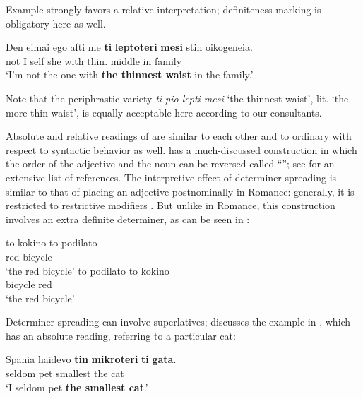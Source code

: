 \documentclass[output=paper
,modfonts
,nonflat]{langsci/langscibook}
\begin{document}
Example  strongly favors a relative interpretation; definiteness\hyp{}marking is obligatory here as well.

\ea \label{ex:coppockstrand:8}
\gll Den eimai ego afti me \textbf{ti} \textbf{leptoteri} \textbf{mesi} stin oikogeneia.\\
not I self she with  thin.\cmpr{} middle in family\\
\glt `I'm not the one with \textbf{the thinnest waist} in the family.'
\z

Note that the periphrastic variety \textit{ti pio lepti mesi} `the thinnest waist', lit. `the more thin waist', is equally acceptable here according to our consultants.

Absolute and relative readings of  are similar to each other and to ordinary  with respect to syntactic behavior as well.  has a much-discussed construction in which the order of the adjective and the noun can be reversed called ``''; see \citet[19]{Alexiadou2014} for an extensive list of references. The interpretive effect of determiner spreading is similar to that of placing an adjective postnominally in Romance: generally, it is restricted to restrictive modifiers \citep{AlexiadouWilder1998}. But unlike in Romance, this construction involves an extra definite determiner, as can be seen in :

\ea \label{ex:coppockstrand:9}
\begin{xlist}
\ex
\gll to kokino to podilato\\
  red   bicycle\\
\glt `the red bicycle'
\ex 
\gll  to podilato to kokino\\
   bicycle   red\\
\glt  `the red bicycle'
\end{xlist}
\z

Determiner spreading can involve superlatives; \citet{Alexiadou2014} discusses the example in , which has an absolute reading, referring to a particular cat:

\ea \label{ex:coppockstrand:10} 
\gll Spania haidevo \textbf{tin} \textbf{mikroteri} \textbf{ti} \textbf{gata}.\\
  seldom pet   smallest the cat\\
  \glt `I seldom pet \textbf{the smallest cat}.'
\z
\end{document}
